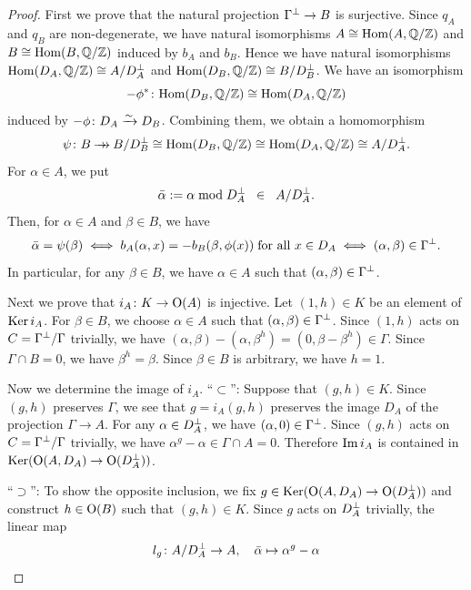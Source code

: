 \documentclass{amsart}
\numberwithin{procedure}{section}
\begin{document}
\begin{proof}
First we prove that the natural projection $\Gamma\sp{\perp}\to B$ is surjective.
Since $q_A$ and $q_B$ are non-degenerate,
we have  natural isomorphisms  $A\cong \mathord{\mathrm{Hom}}(A, \mathord{\mathbb Q}/\mathord{\mathbb Z})$ and $B\cong \mathord{\mathrm{Hom}}(B, \mathord{\mathbb Q}/\mathord{\mathbb Z})$
induced by $b_A$ and $b_B$.
Hence we have natural isomorphisms $\mathord{\mathrm{Hom}}(D_A, \mathord{\mathbb Q}/\mathord{\mathbb Z})\cong A/D_A\sp{\perp}$
and $\mathord{\mathrm{Hom}}(D_B, \mathord{\mathbb Q}/\mathord{\mathbb Z})\cong B/D_B\sp{\perp}$.
We have an isomorphism 
\[
-\phi^*\colon  \mathord{\mathrm{Hom}}(D_B, \mathord{\mathbb Q}/\mathord{\mathbb Z})\cong \mathord{\mathrm{Hom}}(D_A, \mathord{\mathbb Q}/\mathord{\mathbb Z})
\]
induced by $-\phi\colon D_A\xrightarrow{\sim} D_B$.
Combining them, 
we obtain a homomorphism 
%
\begin{equation}\label{eq:psi}
\psi\colon B\mathbin{\to \hskip -7pt \to} B/D_B\sp{\perp}\cong \mathord{\mathrm{Hom}}(D_B, \mathord{\mathbb Q}/\mathord{\mathbb Z})\cong \mathord{\mathrm{Hom}}(D_A, \mathord{\mathbb Q}/\mathord{\mathbb Z}) \cong A/D_A\sp{\perp}.
\end{equation}
%
For $\alpha\in A$, 
we put
\[
\bar{\alpha}:=\alpha \bmod D_A\sp{\perp} \;\;\in \;\; A/D_A\sp{\perp}.
\]
Then, for $\alpha\in A$ and $\beta\in B$,  we have 
%
\begin{equation}\label{eq:aabbequiv}
\bar{\alpha}=\psi(\beta) 
%
\;\Longleftrightarrow \;  
b_A(\alpha, x)=-b_B(\beta, \phi(x)) \;\textrm{for all $x\in D_A$}
%
\; \Longleftrightarrow \;
(\alpha, \beta)\in \Gamma\sperp.
\end{equation}
%
In particular, 
for any $\beta\in B$, 
we have  $\alpha\in A$ such that  $(\alpha, \beta)\in \Gamma\sp{\perp}$.
\par
Next we prove that $i_A\colon K\to \mathord{\mathrm{O}}(A)$ is injective.
Let $(1, h)\in K $ be an element of $\operatorname{\mathrm{Ker}}\nolimits i_A$.
For  $\beta\in B$,
we choose $\alpha\in A$ such that $(\alpha, \beta)\in \Gamma\sp{\perp}$.
Since $(1, h)$ acts on $C=\Gamma\sp{\perp}/\Gamma$ trivially, 
we have $(\alpha, \beta)-(\alpha, \beta^h)=(0, \beta-\beta^h)\in \Gamma$.
Since $\Gamma\cap B=0$, we have $\beta^h=\beta$.
Since $\beta\in B$ is arbitrary, we have $h=1$.
\par
Now we determine the image of $i_A$. ``$\subset$'':
Suppose that $(g, h)\in K$.
Since $(g, h)$ preserves  $\Gamma$,
we see that $g=i_A(g, h)$ preserves the image $D_A$ 
of the projection $\Gamma\to A$.
For any $\alpha\in D_A\sp{\perp}$, we have 
$(\alpha, 0)\in \Gamma\sp{\perp}$.
Since  $(g, h)$ acts on $C=\Gamma\sp{\perp}/\Gamma$ trivially,
we have $\alpha^g-\alpha\in \Gamma\cap A=0$.
Therefore 
 $\operatorname{\mathrm{Im}}\nolimits i_A$ is contained in $\operatorname{\mathrm{Ker}}\nolimits (\mathord{\mathrm{O}}(A, D_A)\to \mathord{\mathrm{O}}(D_A\sp{\perp}))$.
\par 
``$\supset$'':
To show the opposite inclusion,
we fix $g\in \operatorname{\mathrm{Ker}}\nolimits (\mathord{\mathrm{O}}(A, D_A)\to \mathord{\mathrm{O}}(D_A\sp{\perp}))$ and 
construct $h\in \mathord{\mathrm{O}}(B)$  such that $(g, h)\in K$.
Since $g$ acts on $D_A\sp{\perp}$ trivially,
the linear map
\[
l_g\colon A/D_A\sp{\perp} \to A, \quad \bar{\alpha}\mapsto \alpha^g-\alpha
\]
\end{proof}
\end{document}
